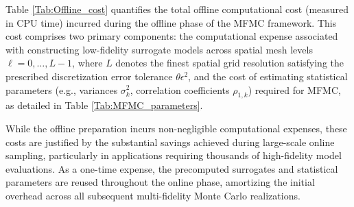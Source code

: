  Table \ref{Tab:Offline_cost} quantifies the total offline computational cost (measured in CPU time) incurred during the offline phase of the MFMC framework.  This cost comprises two primary components: the computational expense associated with constructing low-fidelity surrogate models across spatial mesh levels  $\ell = 0, \ldots, L-1$, where $L$ denotes the finest spatial grid resolution satisfying the prescribed discretization error tolerance $\theta\epsilon^2$, and the cost of estimating statistical parameters (e.g., variances $\sigma_k^2$, correlation coefficients $\rho_{1,k}$) required for MFMC, as detailed in Table \ref{Tab:MFMC_parameters}. 
 
 While the offline preparation incurs non-negligible computational expenses, these costs are justified by the substantial savings achieved during large-scale online sampling, particularly in applications requiring thousands of high-fidelity model evaluations. As a one-time expense, the precomputed surrogates and statistical parameters are reused throughout the online phase, amortizing the initial overhead across all subsequent multi-fidelity Monte Carlo realizations.

%
\begin{table}[ht]
\centering
{}
\caption{Computational costs and sample requirements for low-fidelity model construction and parameter estimation. The second row: CPU time required to construct low-fidelity models $\widehat u_{h,k}$, generated using a sparse grid of level $q=1$ on coarser meshes than the high-fidelity model. The third row: CPU time for parameter estimation using a dynamic strategy with $\delta-0.01$. The last row: number of samples needed to compute the coefficients for each low-fidelity model.}
\label{Tab:Offline_cost}
\end{table}
%





